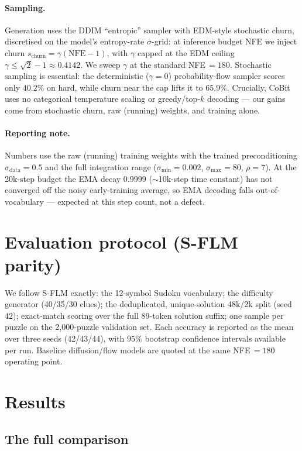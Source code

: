 \documentclass[11pt]{article}
\begin{document}
\paragraph{Sampling.} Generation uses the DDIM ``entropic'' sampler with EDM-style stochastic churn,
discretised on the model's entropy-rate $\sigma$-grid: at inference budget NFE we inject churn
$s_{\mathrm{churn}}=\gamma(\mathrm{NFE}-1)$, with $\gamma$ capped at the EDM ceiling
$\gamma\leq\sqrt{2}-1\approx0.4142$. We sweep $\gamma$ at the standard NFE\,$=180$. Stochastic sampling is
essential: the deterministic ($\gamma{=}0$) probability-flow sampler scores only $40.2\%$ on hard, while
churn near the cap lifts it to $65.9\%$. Crucially, CoBit uses no categorical temperature scaling or
greedy/top-$k$ decoding --- our gains come from stochastic churn, raw (running) weights, and training alone.

\paragraph{Reporting note.} Numbers use the raw (running) training weights with the trained
preconditioning $\sigma_{\mathrm{data}}=0.5$ and the full integration range ($\sigma_{\min}=0.002$,
$\sigma_{\max}=80$, $\rho=7$). At the 20k-step budget the EMA decay 0.9999 ($\sim$10k-step time constant)
has not converged off the noisy early-training average, so EMA decoding falls out-of-vocabulary --- expected
at this step count, not a defect.

\section{Evaluation protocol (S-FLM parity)}

We follow S-FLM exactly: the 12-symbol Sudoku vocabulary; the difficulty generator (40/35/30 clues); the
deduplicated, unique-solution 48k/2k split (seed 42); exact-match scoring over the full 89-token solution
suffix; one sample per puzzle on the 2{,}000-puzzle validation set. Each accuracy is reported as the mean
over three seeds (42/43/44), with $95\%$ bootstrap confidence intervals available per run. Baseline
diffusion/flow models are quoted at the same NFE\,$=180$ operating point.

\section{Results}

\subsection{The full comparison}
\end{document}
